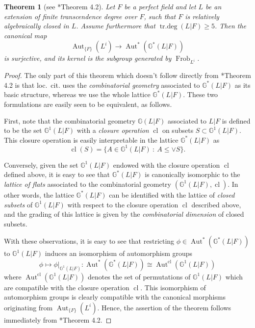 \documentclass[11pt]{amsart}
\newtheorem{theorem}[proposition]{Theorem}
\theoremstyle{definition}
\theoremstyle{remark}
\numberwithin{equation}{section}
\DeclareMathOperator{\Aut}{Aut}
\DeclareMathOperator{\cl}{cl}
\DeclareMathOperator{\trdeg}{tr.deg}
\newcommand{\G}{\mathbb{G}}
\newcommand{\Gbb}{\mathbb{G}}
\newcommand{\Frob}{\operatorname{Frob}}
\begin{document}
\begin{theorem}[see \cite{Gismatullin:2008}*{Theorem 4.2}]
\label{theorem: lattice / acl / fund-thm-field-acl}
  Let $F$ be a perfect field and let $L$ be an extension of finite transcendence degree over $F$, such that $F$ is relatively algebraically closed in $L$.
  Assume furthermore that $\trdeg(L|F) \geq 5$.
  Then the canonical map 
  \[ \Aut_{\{F\}}(L^i) \rightarrow \Aut^*(\G^*(L|F)) \]
  is surjective, and its kernel is the subgroup generated by $\Frob_{L^i}$.
\end{theorem}
\begin{proof}
  The only part of this theorem which doesn't follow directly from \cite{Gismatullin:2008}*{Theorem 4.2} is that loc.~cit. uses the \emph{combinatorial geometry} associated to $\Gbb^*(L|F)$ as its basic structure, whereas we use the whole lattice $\Gbb^*(L|F)$.
  These two formulations are easily seen to be equivalent, as follows.

  First, note that the combinatorial geometry $\Gbb(L|F)$ associated to $L|F$ is defined to be the set $\Gbb^1(L|F)$ with a \emph{closure operation} $\cl$ on subsets $S \subset \Gbb^1(L|F)$.
  This closure operation is easily interpretable in the lattice $\Gbb^*(L|F)$ as 
  \[ \cl(S) = \{A \in \Gbb^1(L|F) \ : \ A \leq \vee S\}. \]

  Conversely, given the set $\Gbb^1(L|F)$ endowed with the closure operation $\cl$ defined above, it is easy to see that $\Gbb^*(L|F)$ is canonically isomorphic to the \emph{lattice of flats} associated to the combinatorial geometry $(\Gbb^1(L|F),\cl)$.
  In other words, the lattice $\Gbb^*(L|F)$ can be identified with the lattice of \emph{closed subsets} of $\Gbb^1(L|F)$ with respect to the closure operation $\cl$ described above, and the grading of this lattice is given by the \emph{combinatorial dimension} of closed subsets.

  With these observations, it is easy to see that restricting $\phi \in \Aut^*(\Gbb^*(L|F))$ to $\Gbb^1(L|F)$ induces an isomorphism of automorphism groups
  \[ \phi \mapsto \phi|_{\G^1(L|F)} : \Aut^*(\Gbb^*(L|F)) \cong \Aut^{\cl}(\Gbb^1(L|F)) \]
  where $\Aut^{\cl}(\Gbb^1(L|F))$ denotes the set of permutations of $\Gbb^1(L|F)$ which are compatible with the closure operation $\cl$.
  This isomorphism of automorphism groups is clearly compatible with the canonical morphisms originating from $\Aut_{\{F\}}(L^i)$.
  Hence, the assertion of the theorem follows immediately from \cite{Gismatullin:2008}*{Theorem 4.2}.
\end{proof}
\end{document}

